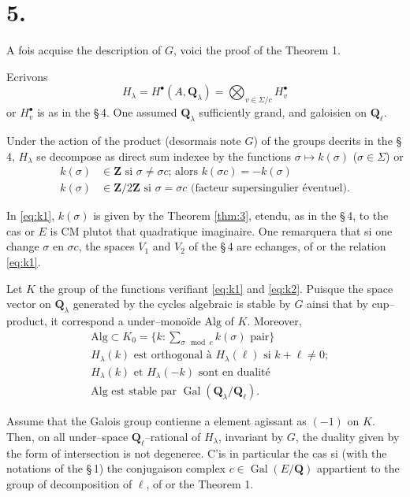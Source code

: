 \documentclass[11pt,a4paper]{article}
\theoremstyle{plain}
\theoremstyle{definition}
\DeclareMathOperator{\Gal}{Gal}
\begin{document}
\section*{5.}

A fois acquise the description of $G$, voici the proof of the Theorem 1.

Ecrivons
\[
H_\lambda = H^\bullet(A, \mathbf{Q}_\lambda) = \bigotimes_{v \in \Sigma/c} H_v^\bullet
\]
or $H_v^\bullet$ is as in the \S\,4. One assumed $\mathbf{Q}_\lambda$ sufficiently grand, and galoisien on $\mathbf{Q}_\ell$.

Under the action of the product (desormais note $G$) of the groups decrits in the \S\,4, $H_\lambda$ se decompose as direct sum indexee by the functions $\sigma \mapsto k(\sigma)$ ($\sigma \in \Sigma$) or
\begin{align}
k(\sigma) &\in \mathbf{Z} \text{ si } \sigma \neq \sigma c \text{; alors } k(\sigma c) = -k(\sigma) \label{eq:k1}\\
k(\sigma) &\in \mathbf{Z}/2\mathbf{Z} \text{ si } \sigma = \sigma c \text{ (facteur supersingulier \'eventuel)} . \label{eq:k2}
\end{align}

In \eqref{eq:k1}, $k(\sigma)$ is given by the Theorem \ref{thm:3}, etendu, as in the \S\,4, to the cas or $E$ is CM plutot that quadratique imaginaire. One remarquera that si one change $\sigma$ en $\sigma c$, the spaces $V_1$ and $V_2$ of the \S\,4 are echanges, of or the relation \eqref{eq:k1}.

Let $K$ the group of the functions verifiant \eqref{eq:k1} and \eqref{eq:k2}. Puisque the space vector on $\mathbf{Q}_\lambda$ generated by the cycles algebraic is stable by $G$ ainsi that by cup--product, it correspond a under--mono\"ide $\mathrm{Alg}$ of $K$. Moreover,
\begin{align}
&\mathrm{Alg} \subset K_0 = \{k : \sum_{\sigma \mod c} k(\sigma) \text{ pair}\} \label{eq:alg1}\\
&H_\lambda(k) \text{ est orthogonal \`a } H_\lambda(\ell) \text{ si } k + \ell \neq 0 \text{;} \label{eq:alg2}\\
&H_\lambda(k) \text{ et } H_\lambda(-k) \text{ sont en dualit\'e} \label{eq:alg3}\\
&\mathrm{Alg} \text{ est stable par } \Gal(\mathbf{Q}_\lambda/\mathbf{Q}_\ell) . \label{eq:alg4}
\end{align}

Assume that the Galois group contienne a element agissant as $(-1)$ on $K$. Then, on all under--space $\mathbf{Q}_\ell$--rational of $H_\lambda$, invariant by $G$, the duality given by the form of intersection is not degeneree. C'is in particular the cas si (with the notations of the \S\,1) the conjugaison complex $c \in \Gal(E/\mathbf{Q})$ appartient to the group of decomposition of $\ell$, of or the Theorem 1.
\end{document}
